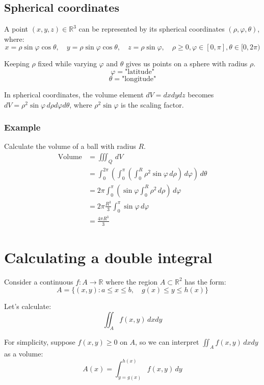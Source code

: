 \documentclass[11pt]{article}
\begin{document}
\newpage
\subsection{Spherical coordinates}
\label{sec:orga4c8c56}
A point \((x, y, z) \in \mathbb{R}^3\) can be represented by its spherical coordinates \((\rho, \varphi, \theta)\), where:
\[x = \rho \sin \varphi \cos \theta, \quad y = \rho \sin \varphi \cos \theta, \quad z = \rho \sin \varphi, \quad \rho \ge 0, \varphi \in [0, \pi], \theta \in [0, 2\pi)\]

Keeping \(\rho\) fixed while varying \(\varphi\) and \(\theta\) gives us points on a sphere with radius \(\rho\).
\[\varphi = \text{"latitude"}\]
\[\theta = \text{"longitude"}\]

In spherical coordinates, the volume element \(dV = dx dy dz\) becomes \(dV = \rho^2 \sin \varphi \, d \rho d \varphi d \theta\), where \(\rho^2 \sin \varphi\) is the scaling factor.
\subsubsection{Example}
\label{sec:org400942c}
Calculate the volume of a ball with radius \(R\).
\begin{align*}
\text{Volume} &= \iiint_Q \, dV \\
&= \int_0^{2 \pi} \left( \int_0^\pi \left(\int_0^R \rho^2 \sin \varphi \, d \rho \right) \, d \varphi \right) \, d \theta \\
&= 2 \pi \int_0^{\pi} \left( \sin \varphi \int_0^R \rho^2 \, d \rho \right) \, d \varphi \\
&= 2 \pi \frac{R^3}{3} \int_0^{\pi} \sin \varphi \, d \varphi \\
&= \frac{4 \pi R^3}{3}
\end{align*}

\newpage
\section{Calculating a double integral}
\label{sec:orgd95cc00}
Consider a continuous \(f : A \rightarrow \mathbb{R}\) where the region \(A \subset \mathbb{R}^2\) has the form:
\[A = \{(x, y) : a \le x \le b, \quad g(x) \le y \le h(x)\}\]

Let's calculate:
\[\iint_A f(x, y) \, dx dy\]

For simplicity, suppose \(f(x, y) \ge 0\) on \(A\), so we can interpret \(\iint_A f(x, y) \, dx dy\) as a volume:
\[A(x) = \int_{y = g(x)}^{h(x)} f(x, y) \, dy\]
\end{document}
